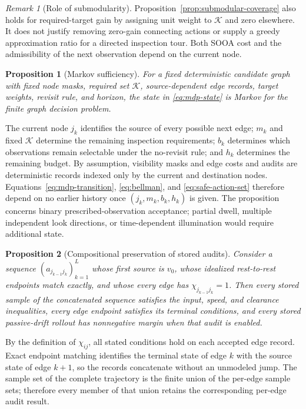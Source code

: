 \documentclass{IEEEtaes}
\newtheorem{proposition}{Proposition}
\theoremstyle{remark}
\newtheorem{remark}{Remark}
\theoremstyle{plain}
\begin{document}
\begin{remark}[Role of submodularity]
Proposition~\ref{prop:submodular-coverage} also holds for required-target gain by assigning unit weight to $\mathcal K$ and zero elsewhere. It does not justify removing zero-gain connecting actions or supply a greedy approximation ratio for a directed inspection tour. Both SOOA cost and the admissibility of the next observation depend on the current node.
\end{remark}

\begin{proposition}[Markov sufficiency]
\label{prop:markov-sufficiency}
For a fixed deterministic candidate graph with fixed node masks, required set $\mathcal K$, source-dependent edge records, target weights, revisit rule, and horizon, the state in \eqref{eq:mdp-state} is Markov for the finite graph decision problem.
\end{proposition}

\begin{IEEEproof}
The current node $j_k$ identifies the source of every possible next edge; $m_k$ and fixed $\mathcal K$ determine the remaining inspection requirements; $b_k$ determines which observations remain selectable under the no-revisit rule; and $h_k$ determines the remaining budget. By assumption, visibility masks and edge costs and audits are deterministic records indexed only by the current and destination nodes. Equations~\eqref{eq:mdp-transition}, \eqref{eq:bellman}, and \eqref{eq:safe-action-set} therefore depend on no earlier history once $(j_k,m_k,b_k,h_k)$ is given. The proposition concerns binary prescribed-observation acceptance; partial dwell, multiple independent look directions, or time-dependent illumination would require additional state.
\end{IEEEproof}

\begin{proposition}[Compositional preservation of stored audits]
\label{prop:audit-composition}
Consider a sequence $(a_{j_{k-1}j_k})_{k=1}^{L}$ whose first source is $v_0$, whose idealized rest-to-rest endpoints match exactly, and whose every edge has $\chi_{j_{k-1}j_k}=1$. Then every stored sample of the concatenated sequence satisfies the input, speed, and clearance inequalities, every edge endpoint satisfies its terminal conditions, and every stored passive-drift rollout has nonnegative margin when that audit is enabled.
\end{proposition}

\begin{IEEEproof}
By the definition of $\chi_{ij}$, all stated conditions hold on each accepted edge record. Exact endpoint matching identifies the terminal state of edge $k$ with the source state of edge $k+1$, so the records concatenate without an unmodeled jump. The sample set of the complete trajectory is the finite union of the per-edge sample sets; therefore every member of that union retains the corresponding per-edge audit result.
\end{IEEEproof}
\end{document}

